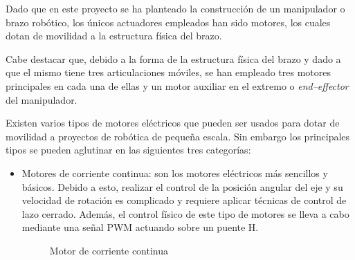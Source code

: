 Dado que en este proyecto se ha planteado la construcción de un manipulador o brazo robótico, los únicos actuadores empleados han sido motores, los cuales dotan de movilidad a la estructura física del brazo.

Cabe destacar que, debido a la forma de la estructura física del brazo y dado a que el mismo tiene tres articulaciones móviles, se han empleado tres motores principales en cada una de ellas y un motor auxiliar en el extremo o \textit{end--effector} del manipulador.

Existen varios tipos de motores eléctricos que pueden ser usados para dotar de movilidad a proyectos de robótica de pequeña escala. Sin embargo los principales tipos se pueden aglutinar en las siguientes tres categorías:

\begin{itemize}
    \item Motores de corriente continua: son los motores eléctricos más sencillos y básicos. Debido a esto, realizar el control de la posición angular del eje y su velocidad de rotación es complicado y requiere aplicar técnicas de control de lazo cerrado. Además, el control físico de este tipo de motores se lleva a cabo mediante una señal \ac{PWM} actuando sobre un puente H.
 
    \begin{figure}[htbp]
    \centering
    \caption{Motor de corriente continua} \label{fig:lego}
    \end{figure}



\end{itemize}

